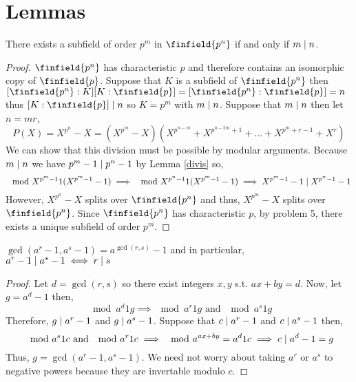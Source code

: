 \documentclass[12pt]{extarticle}
\begin{document}
\section*{Lemmas}

\begin{lemma} \label{prob6}
There exists a subfield of order $p^m$ in $\finfield{p^n}$ if and only if $m \mid n$.
\end{lemma}
\begin{proof}
$\finfield{p^n}$ has characteristic $p$ and therefore contains an isomorphic copy of $\finfield{p}$. Suppose that $K$ is a subfield of $\finfield{p^n}$ then $[\finfield{p^n} : K][K : \finfield{p}] = [\finfield{p^n} : \finfield{p}] = n$ thus $[K : \finfield{p}] \divides n$ so $K = p^m$ with $m \mid n$. Suppose that $m \mid n$ then let $n = mr$,
\[P(X) = X^{p^n} - X = (X^{p^m} - X) (X^{p^{n - m}} + X^{p^{n - 2m} + 1} + \dots + X^{p^m + r - 1} + X^{r})\]
We can show that this division must be possible by modular arguments. Because $m \mid n$ we have $p^m - 1 \mid p^n - 1$ by Lemma \ref{divis} so,
\[ \mod{X^{p^m - 1}}{1}{(X^{p^m - 1} - 1)} \implies \mod{X^{p^n - 1}}{1}{(X^{p^m - 1} - 1)} \implies X^{p^m - 1} - 1 \mid X^{p^n - 1} - 1\]
However, $X^{p^n} - X$ splits over $\finfield{p^n}$ and thus, $X^{p^m} - X$ splits over $\finfield{p^n}$. Since $\finfield{p^n}$ has characteristic $p$, by problem 5, there exists a unique subfield of order $p^m$. 
\end{proof}

\begin{lemma} \label{divis}
$\gcd{(a^r - 1, a^s - 1)} = a^{\gcd{(r,s)}} - 1$ and in particular, $a^r - 1 \mid a^s - 1 \iff r \mid s$
\end{lemma}

\begin{proof}
Let $d = \gcd(r,s)$ so there exist integers $x,y$ s.t. $ax + by = d$. Now, let $g = a^d - 1$ then,
\[\mod{a^d}{1}{g} \implies \mod{a^r}{1}{g} \text{ and } \mod{a^s}{1}{g}\]
Therefore, $g \mid a^r -1$ and $g \mid a^s - 1$. Suppose that $c \mid a^r - 1$ and $c \mid a^s - 1$ then, 
\[\mod{a^s}{1}{c} \text{ and } \mod{a^r}{1}{c} \implies \mod{a^{ax + by} = a^d}{1}{c} \implies c \mid a^d - 1 = g \]
Thus, $g = \gcd{(a^r - 1, a^s - 1)}$. We need not worry about taking $a^r$ or $a^s$ to negative powers because they are invertable modulo $c$.  
\end{proof}
\end{document}
